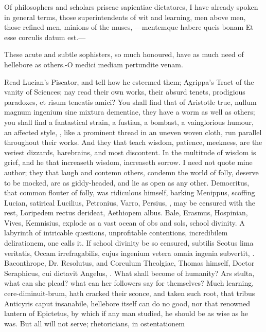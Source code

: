 {Of philosophers and scholars priscae sapientiae dictatores, I have
already spoken in general terms, those superintendents of wit and
learning, men above men, those refined men, minions of the muses,
---mentemque habere queis bonam
Et esse corculis datum est.---

These acute and subtle sophisters, so much honoured, have as much
need of hellebore as others.-O medici mediam pertundite venam.

Read Lucian's Piscator, and tell how he esteemed them; Agrippa's Tract
of the vanity of Sciences; nay read their own works, their absurd
tenets, prodigious paradoxes, et risum teneatis amici? You shall find
that of Aristotle true, nullum magnum ingenium sine mixtura dementiae,
they have a worm as well as others; you shall find a fantastical
strain, a fustian, a bombast, a vainglorious humour, an affected style,
\etc{}, like a prominent thread in an uneven woven cloth, run parallel
throughout their works. And they that teach wisdom, patience, meekness,
are the veriest dizzards, harebrains, and most discontent. In the
multitude of wisdom is grief, and he that increaseth wisdom, increaseth
sorrow. I need not quote mine author; they that laugh and contemn
others, condemn the world of folly, deserve to be mocked, are as
giddy-headed, and lie as open as any other. Democritus, that
common flouter of folly, was ridiculous himself, barking Menippus,
scoffing Lucian, satirical Lucilius, Petronius, Varro, Persius, \etc{},
may be censured with the rest, Loripedem rectus derideat, Aethiopem
albus. Bale, Erasmus, Hospinian, Vives, Kemnisius, explode as a vast
ocean of obs and sols, school divinity. A labyrinth of intricable
questions, unprofitable contentions, incredibilem delirationem, one
calls it. If school divinity be so censured, subtilis Scotus lima
veritatis, Occam irrefragabilis, cujus ingenium vetera omnia ingenia
subvertit, \etc{}. Baconthrope, Dr. Resolutus, and Corculum Theolgiae,
Thomas himself, Doctor Seraphicus, cui dictavit Angelus, \etc{}. What
shall become of humanity? Ars stulta, what can she plead? what can her
followers say for themselves? Much learning,  cere-diminuit-brum,
hath cracked their sconce, and taken such root, that tribus Anticyris
caput insanabile, hellebore itself can do no good, nor that renowned
lantern of Epictetus, by which if any man studied, he should be as
wise as he was. But all will not serve; rhetoricians, in ostentationem
}
